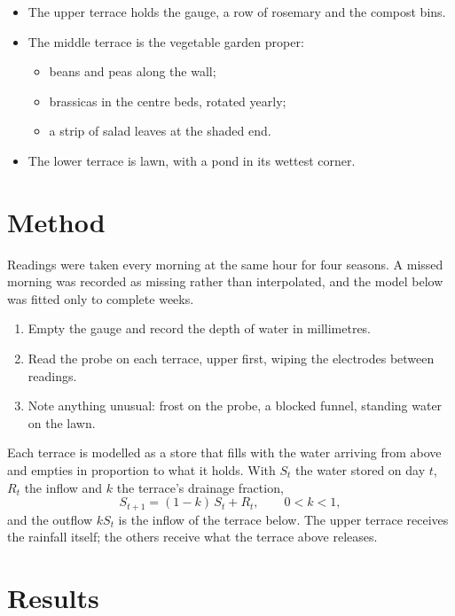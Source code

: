 \documentclass{article}
\begin{document}
\begin{itemize}
  \item The upper terrace holds the gauge, a row of rosemary and the
  compost bins.
  \item The middle terrace is the vegetable garden proper:
  \begin{itemize}
    \item beans and peas along the wall;
    \item brassicas in the centre beds, rotated yearly;
    \item a strip of salad leaves at the shaded end.
  \end{itemize}
  \item The lower terrace is lawn, with a pond in its wettest corner.
\end{itemize}

\section{Method}

Readings were taken every morning at the same hour for four seasons. A
missed morning was recorded as missing rather than interpolated, and the
model below was fitted only to complete weeks.

\begin{enumerate}
  \item Empty the gauge and record the depth of water in millimetres.
  \item Read the probe on each terrace, upper first, wiping the
  electrodes between readings.
  \item Note anything unusual: frost on the probe, a blocked funnel,
  standing water on the lawn.
\end{enumerate}

Each terrace is modelled as a store that fills with the water arriving
from above and empties in proportion to what it holds. With $S_t$ the
water stored on day $t$, $R_t$ the inflow and $k$ the terrace's drainage
fraction,
\begin{equation}
  S_{t+1} = (1 - k)\, S_t + R_t ,
  \qquad 0 < k < 1 ,
\end{equation}
and the outflow $k S_t$ is the inflow of the terrace below. The upper
terrace receives the rainfall itself; the others receive what the terrace
above releases.

\section{Results}
\end{document}
